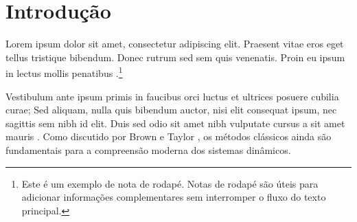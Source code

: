 \section{Introdução}

\lipsum[2-3] Lorem ipsum dolor sit amet, consectetur adipiscing elit. Praesent vitae eros eget tellus tristique bibendum. Donec rutrum sed sem quis venenatis. Proin eu ipsum in lectus mollis penatibus \cite{santos2024, oliveira2023}.\footnote{Este é um exemplo de nota de rodapé. Notas de rodapé são úteis para adicionar informações complementares sem interromper o fluxo do texto principal.}

Vestibulum ante ipsum primis in faucibus orci luctus et ultrices posuere cubilia curae; Sed aliquam, nulla quis bibendum auctor, nisi elit consequat ipsum, nec sagittis sem nibh id elit. Duis sed odio sit amet nibh vulputate cursus a sit amet mauris \cite{silva2025}. Como discutido por Brown e Taylor \cite[p.~45]{brown2023}, os métodos clássicos ainda são fundamentais para a compreensão moderna dos sistemas dinâmicos.
